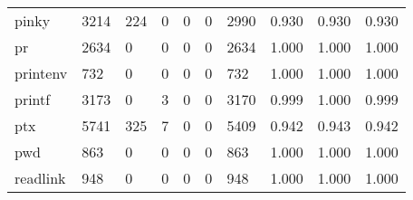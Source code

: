 \begin{longtable}{lp{1.3cm}p{1.3cm}p{1.3cm}p{1.3cm}p{1.3cm}p{1.3cm}p{1.3cm}p{1.3cm}p{1.3cm}}
pinky     &                   3214 &                                224 &                                 0 &                                0 &                                 0 &                            2990 &                                0.930 &                                  0.930 &                                0.930 \\
pr        &                   2634 &                                  0 &                                 0 &                                0 &                                 0 &                            2634 &                                1.000 &                                  1.000 &                                1.000 \\
printenv  &                    732 &                                  0 &                                 0 &                                0 &                                 0 &                             732 &                                1.000 &                                  1.000 &                                1.000 \\
printf    &                   3173 &                                  0 &                                 3 &                                0 &                                 0 &                            3170 &                                0.999 &                                  1.000 &                                0.999 \\
ptx       &                   5741 &                                325 &                                 7 &                                0 &                                 0 &                            5409 &                                0.942 &                                  0.943 &                                0.942 \\
pwd       &                    863 &                                  0 &                                 0 &                                0 &                                 0 &                             863 &                                1.000 &                                  1.000 &                                1.000 \\
readlink  &                    948 &                                  0 &                                 0 &                                0 &                                 0 &                             948 &                                1.000 &                                  1.000 &                                1.000 \\

\end{longtable}
